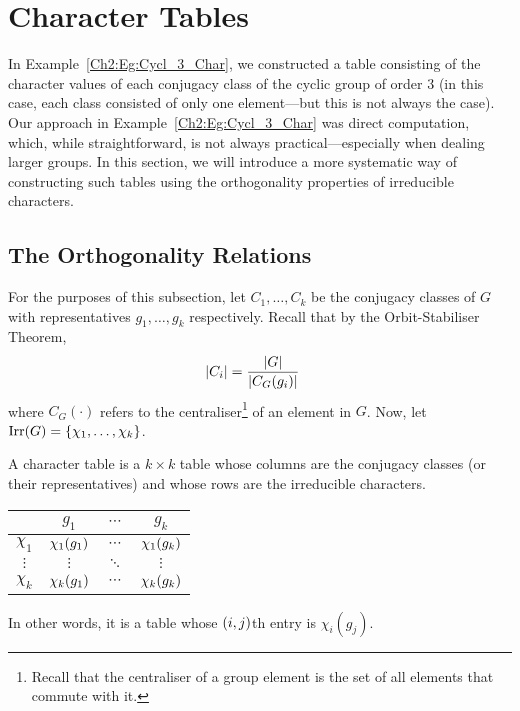 \section{Character Tables}

In Example~\ref{Ch2:Eg:Cycl_3_Char}, we constructed a table consisting of the character values of each conjugacy class of the cyclic group of order $3$ (in this case, each class consisted of only one element---but this is not always the case). Our approach in Example~\ref{Ch2:Eg:Cycl_3_Char} was direct computation, which, while straightforward, is not always practical---especially when dealing larger groups. In this section, we will introduce a more systematic way of constructing such tables using the orthogonality properties of irreducible characters.

\subsection{The Orthogonality Relations}

\begin{boxnotation}
For the purposes of this subsection, let $C_1, \ldots, C_k$ be the conjugacy classes of $G$ with representatives $g_1, \ldots, g_k$ respectively. Recall that by the Orbit-Stabiliser Theorem,
\begin{align*}
    \left\lvert C_i \right\rvert &= \frac{\left\lvert G \right\rvert}{\left\lvert C_G(g_i) \right\rvert}
\end{align*}
where $C_G(\cdot)$ refers to the centraliser\footnote{Recall that the centraliser of a group element is the set of all elements that commute with it.} of an element in $G$. Now, let $\operatorname{Irr}\!\left( G \right) = \left\{ \chi_1, \ldots, \chi_k \right\}$.
\end{boxnotation}

\begin{boxdefinition}
    A character table is a $k \times k$ table whose columns are the conjugacy classes (or their representatives) and whose rows are the irreducible characters.
    \begin{table}[H]
        \centering
        \begin{tabular}{c|ccc}
            & $g_1$ & $\cdots$ & $g_k$ \\
            \hline
            $\chi_1$ & $\chi_{1}\!\left( g_1 \right)$ & $\cdots$ & $\chi_{1}\!\left( g_k \right)$ \\
            $\vdots$ & $\vdots$ & $\ddots$ & $\vdots$ \\
            $\chi_k$ & $\chi_{k}\!\left( g_1 \right)$ & $\cdots$ & $\chi_{k}\!\left( g_k \right)$
        \end{tabular}
    \end{table}
    In other words, it is a table whose $\left( i,j \right)$th entry is $\chi_i(g_j)$.
\end{boxdefinition}

